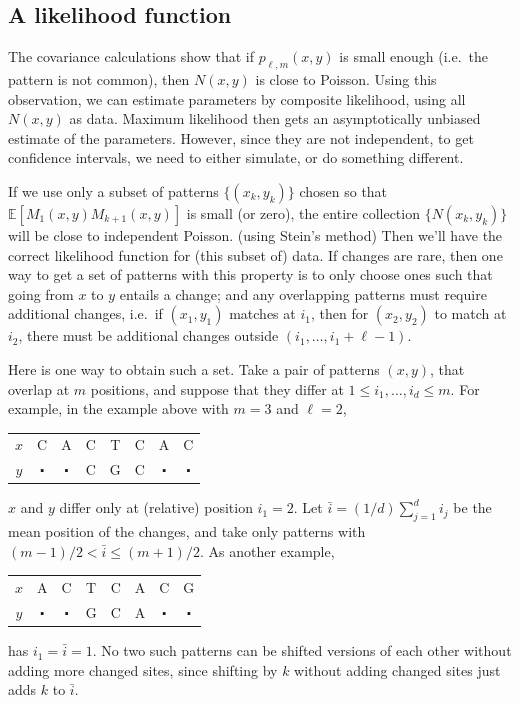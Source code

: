 \documentclass{article}
\newcommand{\E}{\mathbb{E}}
\theoremstyle{plain}
\theoremstyle{definition}
\begin{document}
\subsection{A likelihood function}

The covariance calculations show that
if $p_{\ell,m}(x,y)$ is small enough (i.e.\ the pattern is not common),
then $N(x,y)$ is close to Poisson.
Using this observation, we can estimate parameters by composite likelihood,
using all $N(x,y)$ as data.
Maximum likelihood then gets an asymptotically unbiased estimate of the parameters.
However, since they are not independent, to get confidence intervals, we need to either simulate, or do something different.

If we use only a subset of patterns $\{(x_k,y_k)\}$ chosen so that $\E[M_1(x,y) M_{k+1}(x,y)]$ is small (or zero),
the entire collection $\{N(x_k,y_k)\}$ will be close to independent Poisson.
(using Stein's method)
Then we'll have the correct likelihood function for (this subset of) data.
If changes are rare, then one way to get a set of patterns with this property is to only choose ones such that going from $x$ to $y$ entails a change;
and any overlapping patterns must require additional changes, 
i.e.\ if $(x_1,y_1)$ matches at $i_1$, 
then for $(x_2,y_2)$ to match at $i_2$, 
there must be additional changes outside $(i_1,\ldots,i_1+\ell-1)$.

Here is one way to obtain such a set.
Take a pair of patterns $(x,y)$, that overlap at $m$ positions,
and suppose that they differ at $1 \le i_1, \ldots, i_d \le m$.
For example, in the example above with $m=3$ and $\ell=2$,
\begin{center}
\begin{tabular}{c|ccccccc}
 $x$ &  C  & A & C & T & C & A & C \\
 $y$ &  $\centerdot$  & $\centerdot$  & C & G & C & $\centerdot$  & $\centerdot$  
\end{tabular}
\end{center}
$x$ and $y$ differ only at (relative) position $i_1=2$.
Let $\bar i = (1/d) \sum_{j=1}^d i_j$ be the mean position of the changes,
and take only patterns with $(m-1)/2 < \bar i \le (m+1)/2$.
As another example,
\begin{center}
\begin{tabular}{c|ccccccc}
 $x$ &  A & C & T & C & A & C & G \\
 $y$ &  $\centerdot$  & $\centerdot$  & G & C & A & $\centerdot$  & $\centerdot$  
\end{tabular}
\end{center}
has $i_1 = \bar i = 1$.
No two such patterns can be shifted versions of each other
without adding more changed sites,
since shifting by $k$ without adding changed sites just adds $k$ to $\bar i$.
\end{document}
